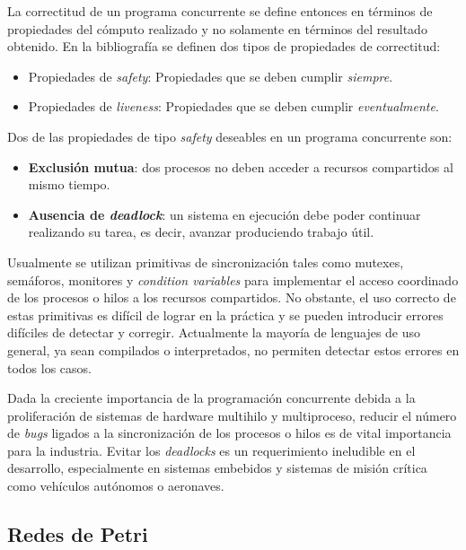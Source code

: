 \documentclass[12pt]{article}
\begin{document}
La correctitud de un programa concurrente se define entonces en términos de propiedades del cómputo realizado y no solamente en términos del
resultado obtenido. En la bibliografía \cite{ben-ari2006, coulouris2012, tanenbaum2017} se definen dos tipos de propiedades de correctitud:

\begin{itemize}
    \item Propiedades de \textit{safety}: Propiedades que se deben cumplir \textit{siempre}.
    \item Propiedades de \textit{liveness}: Propiedades que se deben cumplir \textit{eventualmente}.
\end{itemize}

Dos de las propiedades de tipo \textit{safety} deseables en un programa concurrente son:

\begin{itemize}
    \item \textbf{Exclusión mutua}: dos procesos no deben acceder a recursos compartidos al mismo tiempo.
    \item \textbf{Ausencia de \textit{deadlock}}: un sistema en ejecución debe poder continuar realizando su tarea, es decir, avanzar produciendo trabajo útil.
\end{itemize}

Usualmente se utilizan primitivas de sincronización tales como mutexes, semáforos, monitores y \textit{condition variables}
para implementar el acceso coordinado de los procesos o hilos a los recursos compartidos.
No obstante, el uso correcto de estas primitivas es difícil de lograr en la práctica y se pueden introducir errores difíciles de detectar y corregir.
Actualmente la mayoría de lenguajes de uso general, ya sean compilados o interpretados, no permiten detectar estos errores en todos los casos.

Dada la creciente importancia de la programación concurrente debida a la proliferación de sistemas de hardware multihilo y multiproceso,
reducir el número de \textit{bugs} ligados a la sincronización de los procesos o hilos es de vital importancia para la industria.
Evitar los \textit{deadlocks} es un requerimiento ineludible en el desarrollo,
especialmente en sistemas embebidos y sistemas de misión crítica como vehículos autónomos o aeronaves.

\subsection{Redes de Petri}
\end{document}
